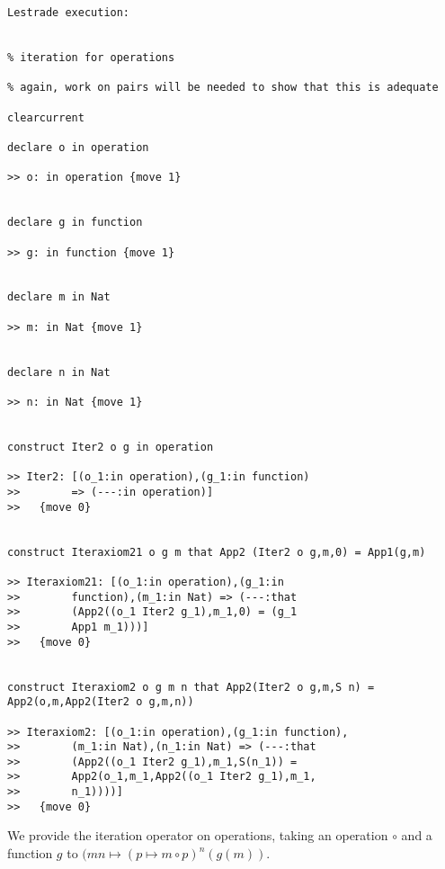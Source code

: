 \documentclass[12pt]{article}
\begin{document}
\begin{verbatim}Lestrade execution:


% iteration for operations

% again, work on pairs will be needed to show that this is adequate

clearcurrent

declare o in operation

>> o: in operation {move 1}


declare g in function

>> g: in function {move 1}


declare m in Nat

>> m: in Nat {move 1}


declare n in Nat

>> n: in Nat {move 1}


construct Iter2 o g in operation

>> Iter2: [(o_1:in operation),(g_1:in function) 
>>        => (---:in operation)]
>>   {move 0}


construct Iteraxiom21 o g m that App2 (Iter2 o g,m,0) = App1(g,m)

>> Iteraxiom21: [(o_1:in operation),(g_1:in 
>>        function),(m_1:in Nat) => (---:that 
>>        (App2((o_1 Iter2 g_1),m_1,0) = (g_1 
>>        App1 m_1)))]
>>   {move 0}


construct Iteraxiom2 o g m n that App2(Iter2 o g,m,S n) = App2(o,m,App2(Iter2 o g,m,n))

>> Iteraxiom2: [(o_1:in operation),(g_1:in function),
>>        (m_1:in Nat),(n_1:in Nat) => (---:that 
>>        (App2((o_1 Iter2 g_1),m_1,S(n_1)) = 
>>        App2(o_1,m_1,App2((o_1 Iter2 g_1),m_1,
>>        n_1))))]
>>   {move 0}

\end{verbatim}

We provide the iteration operator on operations, taking an operation $\circ$ and a function $g$ to $(mn \mapsto (p \mapsto m \circ p)^n(g(m))$. 
\end{document}
